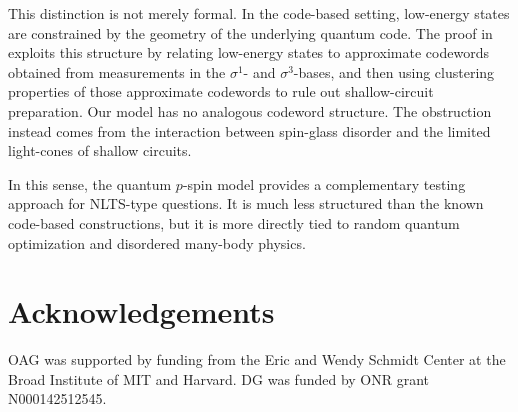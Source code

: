 \documentclass[12pt]{article}
\begin{document}
\begin{appendix}
This distinction is not merely formal. In the code-based setting, low-energy states are constrained by the geometry of the underlying quantum code. The proof in~\cite{anshu2023nlts} exploits this structure by relating low-energy states to approximate codewords obtained from measurements in the
\(\sigma^1\)- and \(\sigma^3\)-bases, and then using clustering properties of those approximate codewords to rule out shallow-circuit preparation. Our model has no analogous codeword structure. The obstruction instead comes from the interaction between spin-glass disorder and the limited light-cones of shallow circuits.

In this sense, the quantum \(p\)-spin model provides a complementary testing approach for NLTS-type questions. It is much less structured than the known code-based constructions, but it is more directly tied to random quantum
optimization and disordered many-body physics.





\end{appendix}



\section*{Acknowledgements}
OAG was supported by funding from the Eric and Wendy Schmidt Center at the Broad Institute of MIT and Harvard. DG was funded by ONR grant N000142512545.






\end{document}
